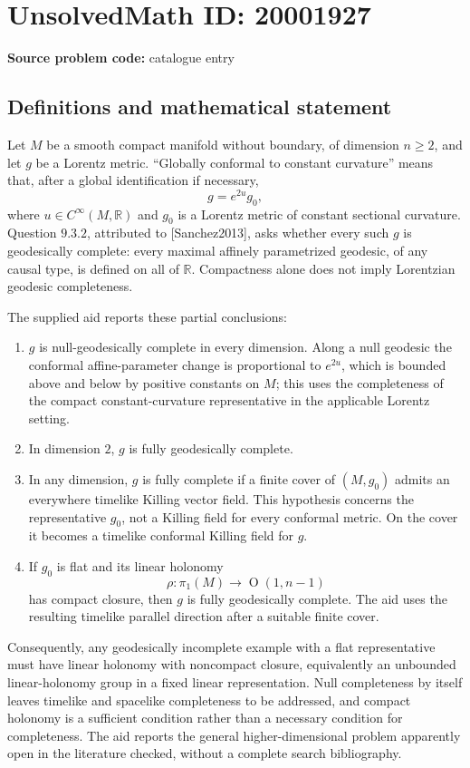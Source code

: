 \documentclass[11pt]{article}
\newcommand{\R}{\mathbb{R}}
\begin{document}
\section*{UnsolvedMath ID: 20001927}
\textbf{Source problem code:} catalogue entry
\subsection{Definitions and mathematical statement}
Let \(M\) be a smooth compact manifold without boundary, of dimension \(n\geq2\), and let \(g\) be a Lorentz metric. ``Globally conformal to constant curvature'' means that, after a global identification if necessary,
\[
 g=e^{2u}g_0,
\]
where \(u\in C^\infty(M,\R)\) and \(g_0\) is a Lorentz metric of constant sectional curvature. Question \(9.3.2\), attributed to [Sanchez2013], asks whether every such \(g\) is geodesically complete: every maximal affinely parametrized geodesic, of any causal type, is defined on all of \(\R\). Compactness alone does not imply Lorentzian geodesic completeness.

The supplied aid reports these partial conclusions:
\begin{enumerate}
\item \(g\) is null-geodesically complete in every dimension. Along a null geodesic the conformal affine-parameter change is proportional to \(e^{2u}\), which is bounded above and below by positive constants on \(M\); this uses the completeness of the compact constant-curvature representative in the applicable Lorentz setting.
\item In dimension \(2\), \(g\) is fully geodesically complete.
\item In any dimension, \(g\) is fully complete if a finite cover of \((M,g_0)\) admits an everywhere timelike Killing vector field. This hypothesis concerns the representative \(g_0\), not a Killing field for every conformal metric. On the cover it becomes a timelike conformal Killing field for \(g\).
\item If \(g_0\) is flat and its linear holonomy
\[
 \rho:\pi_1(M)\to\operatorname{O}(1,n-1)
\]
has compact closure, then \(g\) is fully geodesically complete. The aid uses the resulting timelike parallel direction after a suitable finite cover.
\end{enumerate}
Consequently, any geodesically incomplete example with a flat representative must have linear holonomy with noncompact closure, equivalently an unbounded linear-holonomy group in a fixed linear representation. Null completeness by itself leaves timelike and spacelike completeness to be addressed, and compact holonomy is a sufficient condition rather than a necessary condition for completeness. The aid reports the general higher-dimensional problem apparently open in the literature checked, without a complete search bibliography.
\end{document}
